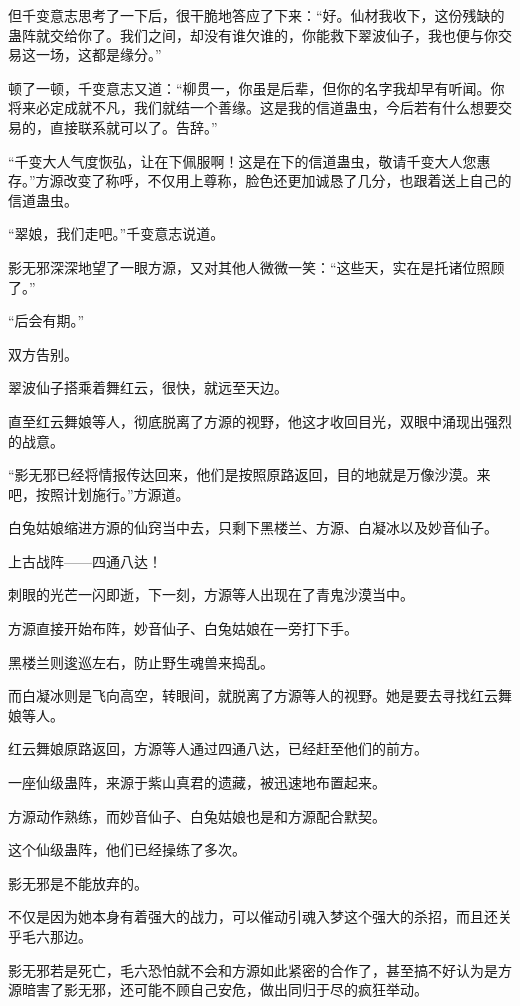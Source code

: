 \begin{this_body}
但千变意志思考了一下后，很干脆地答应了下来：“好。仙材我收下，这份残缺的蛊阵就交给你了。我们之间，却没有谁欠谁的，你能救下翠波仙子，我也便与你交易这一场，这都是缘分。”

顿了一顿，千变意志又道：“柳贯一，你虽是后辈，但你的名字我却早有听闻。你将来必定成就不凡，我们就结一个善缘。这是我的信道蛊虫，今后若有什么想要交易的，直接联系就可以了。告辞。”

“千变大人气度恢弘，让在下佩服啊！这是在下的信道蛊虫，敬请千变大人您惠存。”方源改变了称呼，不仅用上尊称，脸色还更加诚恳了几分，也跟着送上自己的信道蛊虫。

“翠娘，我们走吧。”千变意志说道。

影无邪深深地望了一眼方源，又对其他人微微一笑：“这些天，实在是托诸位照顾了。”

“后会有期。”

双方告别。

翠波仙子搭乘着舞红云，很快，就远至天边。

直至红云舞娘等人，彻底脱离了方源的视野，他这才收回目光，双眼中涌现出强烈的战意。

“影无邪已经将情报传达回来，他们是按照原路返回，目的地就是万像沙漠。来吧，按照计划施行。”方源道。

白兔姑娘缩进方源的仙窍当中去，只剩下黑楼兰、方源、白凝冰以及妙音仙子。

上古战阵——四通八达！

刺眼的光芒一闪即逝，下一刻，方源等人出现在了青鬼沙漠当中。

方源直接开始布阵，妙音仙子、白兔姑娘在一旁打下手。

黑楼兰则逡巡左右，防止野生魂兽来捣乱。

而白凝冰则是飞向高空，转眼间，就脱离了方源等人的视野。她是要去寻找红云舞娘等人。

红云舞娘原路返回，方源等人通过四通八达，已经赶至他们的前方。

一座仙级蛊阵，来源于紫山真君的遗藏，被迅速地布置起来。

方源动作熟练，而妙音仙子、白兔姑娘也是和方源配合默契。

这个仙级蛊阵，他们已经操练了多次。

影无邪是不能放弃的。

不仅是因为她本身有着强大的战力，可以催动引魂入梦这个强大的杀招，而且还关乎毛六那边。

影无邪若是死亡，毛六恐怕就不会和方源如此紧密的合作了，甚至搞不好认为是方源暗害了影无邪，还可能不顾自己安危，做出同归于尽的疯狂举动。


\end{this_body}
